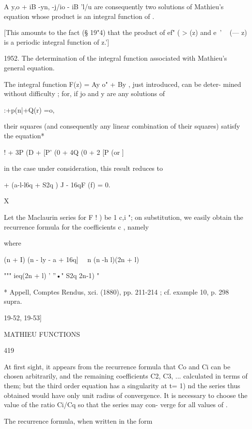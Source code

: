 A y,o + iB -yn,  -j/io - iB 'l/u 
are consequently two solutions of Mathieu's equation whose product is an 
integral function of  . 

[This amounts to the fact (§ 19"4) that the product of ef"  ( > (z) and 
e~' ~  (— z) is a periodic integral function of z.'] 

1952. The determination of the integral function associated with Mathieu's 
general equation. 

The integral function F(z) = Ay o" + By  , just introduced, can be deter- 
mined without difficulty ; for, if  jo and y  are any solutions of 

 :+p(n|+Q(r) =o, 

their squares (and consequently any linear combination of their squares) 
satisfy the equation* 

 ! + 3P (D   + [P' (0 + 4Q (0 + 2 [P (or ]  

in the case under consideration, this result reduces to 

+ (a-l-l6q + S2q )  J  -  16qF (f) = 0. 

X 

Let the Maclaurin series for F ! ) be 1 c,i "; on substitution, we easily 
obtain the recurrence formula for the coefficients c , namely 



where 



(n + I)  (n -  ly - a + 16q] \  \  n (n -h l)(2n + l) 

""" ieq(2n + l) '  ''•" S2q 2n-1) " 

* Appell, Comptes Rendus, xci. (1880), pp. 211-214 ; cf. example 10, p. 298 supra. 



19-52, 19-53] 



MATHIEU FUNCTIONS 



419 



At first sight, it appears from the recurrence formula that Co and Ci can 
be chosen arbitrarily, and the remaining coefficients C2, C3, ... calculated in 
terms of them; but the third order equation has a singularity at t= 1)  nd 
the series thus obtained would have only unit radius of convergence. It is 
necessary to choose the value of the ratio Ci/Cq so that the series may con- 
verge for all values of  . 

The recurrence formula, when written in the form 



